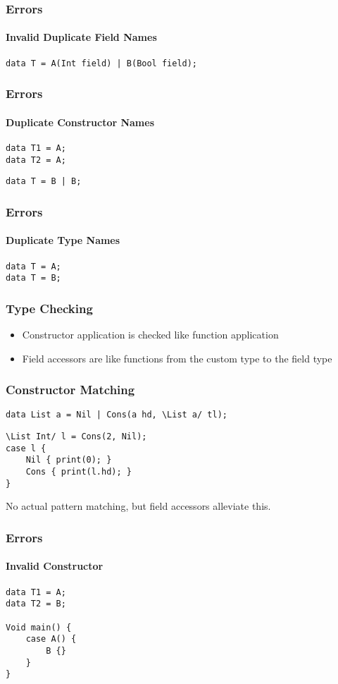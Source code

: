 \documentclass[12pt]{beamer}
\begin{document}
\begin{frame}[fragile]
    \frametitle{Errors}
    \framesubtitle{Invalid Duplicate Field Names}
    \begin{verbatim}
data T = A(Int field) | B(Bool field);\end{verbatim}
\end{frame}

\begin{frame}[fragile]
    \frametitle{Errors}
    \framesubtitle{Duplicate Constructor Names}
    \begin{verbatim}
data T1 = A;
data T2 = A;\end{verbatim}
    \begin{verbatim}
data T = B | B;\end{verbatim}
\end{frame}

\begin{frame}[fragile]
    \frametitle{Errors}
    \framesubtitle{Duplicate Type Names}
    \begin{verbatim}
data T = A;
data T = B;\end{verbatim}
\end{frame}

\begin{frame}
    \frametitle{Type Checking}
    \begin{itemize}
        \item Constructor application is checked like function application
        \item Field accessors are like functions from the custom type to the field type
    \end{itemize}
\end{frame}

\begin{frame}[fragile]
    \frametitle{Constructor Matching}
    \begin{verbatim}
data List a = Nil | Cons(a hd, \List a/ tl);\end{verbatim}
    \begin{verbatim}
\List Int/ l = Cons(2, Nil);
case l {
    Nil { print(0); }
    Cons { print(l.hd); }
}\end{verbatim}
    No actual pattern matching, but field accessors alleviate this.
\end{frame}

\begin{frame}[fragile]
    \frametitle{Errors}
    \framesubtitle{Invalid Constructor}
    \begin{verbatim}
data T1 = A;
data T2 = B;

Void main() {
    case A() {
        B {}
    }
}\end{verbatim}
\end{frame}
\end{document}
